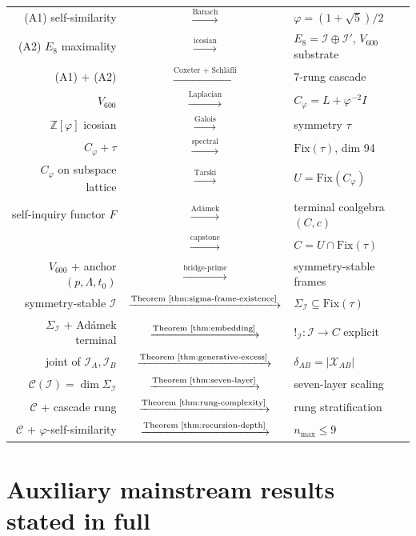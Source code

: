 \documentclass[11pt]{article}
\theoremstyle{plain}
\theoremstyle{definition}
\theoremstyle{remark}
\newcommand{\Zphi}{\mathbb{Z}[\varphi]}
\newcommand{\Ical}{\mathcal{I}}
\newcommand{\Ccal}{\mathcal{C}}
\newcommand{\Fix}{\mathrm{Fix}}
\newcommand{\Cph}{C_\varphi}
\newcommand{\Xcal}{\mathcal{X}}
\begin{document}
\begin{center}
\renewcommand{\arraystretch}{1.25}
\begin{tabular}{rcl}
(A1) self-similarity & $\xrightarrow{\text{Banach}}$ & $\varphi = (1+\sqrt{5})/2$ \\
(A2) $E_8$ maximality & $\xrightarrow{\text{icosian}}$ & $E_8 = \Ical \oplus \Ical'$, $V_{600}$ substrate \\
(A1) + (A2) & $\xrightarrow{\text{Coxeter + Schl\"afli}}$ & 7-rung cascade \\
$V_{600}$ & $\xrightarrow{\text{Laplacian}}$ & $\Cph = L + \varphi^{-2}I$ \\
$\Zphi$ icosian & $\xrightarrow{\text{Galois}}$ & symmetry $\tau$ \\
$\Cph + \tau$ & $\xrightarrow{\text{spectral}}$ & $\Fix(\tau)$, dim 94 \\
$\Cph$ on subspace lattice & $\xrightarrow{\text{Tarski}}$ & $U = \Fix(\Cph)$ \\
self-inquiry functor $F$ & $\xrightarrow{\text{Adámek}}$ & terminal coalgebra $(C, c)$ \\
& $\xrightarrow{\text{capstone}}$ & $C = U \cap \Fix(\tau)$ \\
$V_{600}$ + anchor $(p, \Lambda, t_0)$ & $\xrightarrow{\text{bridge-prime}}$ & symmetry-stable frames \\
symmetry-stable $\Ical$ & $\xrightarrow{\text{Theorem~\ref{thm:sigma-frame-existence}}}$ & $\Sigma_\Ical \subseteq \Fix(\tau)$ \\
$\Sigma_\Ical$ + Adámek terminal & $\xrightarrow{\text{Theorem~\ref{thm:embedding}}}$ & $!_\Ical: \Ical \to C$ explicit \\
joint of $\Ical_A, \Ical_B$ & $\xrightarrow{\text{Theorem~\ref{thm:generative-excess}}}$ & $\delta_{AB} = |\Xcal_{AB}|$ \\
$\Ccal(\Ical) = \dim \Sigma_\Ical$ & $\xrightarrow{\text{Theorem~\ref{thm:seven-layer}}}$ & seven-layer scaling \\
$\Ccal$ + cascade rung & $\xrightarrow{\text{Theorem~\ref{thm:rung-complexity}}}$ & rung stratification \\
$\Ccal$ + $\varphi$-self-similarity & $\xrightarrow{\text{Theorem~\ref{thm:recursion-depth}}}$ & $n_{\max} \leq 9$ \\
\bottomrule
\end{tabular}
\end{center}

\section{Auxiliary mainstream results stated in full}\label{app:mainstream}
\end{document}
